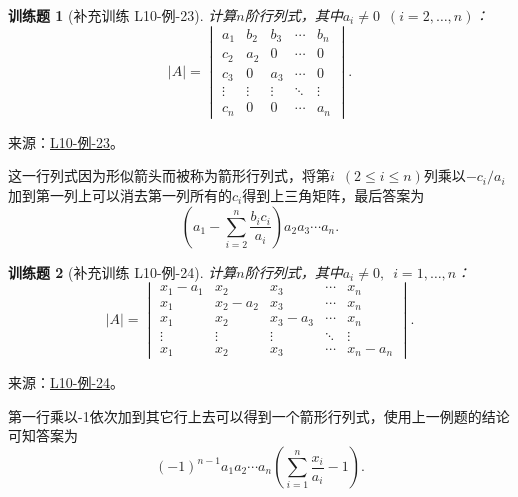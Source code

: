 \documentclass[12pt,fontset=fandol]{ctexart}
\newtheorem{exercise}{训练题}[section]
\begin{document}
\begin{exercise}[补充训练 L10-例-23]\label{prob:L10-例-23}
计算$n$阶行列式，其中$a_i\neq 0\enspace(i=2,\ldots,n)$：
    \[|A|=\begin{vmatrix}
            a_1    & b_2    & b_3    & \cdots & b_n    \\
            c_2    & a_2    & 0      & \cdots & 0      \\
            c_3    & 0      & a_3    & \cdots & 0      \\
            \vdots & \vdots & \vdots & \ddots & \vdots \\
            c_n    & 0      & 0      & \cdots & a_n
        \end{vmatrix}.\]
\end{exercise}
\noindent 来源：\href{https://github.com/yhwu-is/Linear-Algebra-Left-Undone/blob/new/%E8%AE%B2%E4%B9%89/%E4%B8%93%E9%A2%98/10%20%E8%A1%8C%E5%88%97%E5%BC%8F.tex}{L10-例-23}。
\begin{solve}
这一行列式因为形似箭头而被称为箭形行列式，将第$i\enspace(2\leqslant i\leqslant n)$列乘以$-c_i/a_i$加到第一列上可以消去第一列所有的$c_i$得到上三角矩阵，最后答案为
    \[
    (a_1-\sum\limits_{i=2}^n\dfrac{b_ic_i}{a_i})a_2a_3\cdots a_n.
    \]
\end{solve}

\begin{exercise}[补充训练 L10-例-24]\label{prob:L10-例-24}
计算$n$阶行列式，其中$a_i\neq 0,\enspace i=1,\ldots,n$：
    \[|A|=\begin{vmatrix}
            x_1-a_1 & x_2     & x_3     & \cdots & x_n     \\
            x_1     & x_2-a_2 & x_3     & \cdots & x_n     \\
            x_1     & x_2     & x_3-a_3 & \cdots & x_n     \\
            \vdots  & \vdots  & \vdots  & \ddots & \vdots  \\
            x_1     & x_2     & x_3     & \cdots & x_n-a_n
        \end{vmatrix}.\]
\end{exercise}
\noindent 来源：\href{https://github.com/yhwu-is/Linear-Algebra-Left-Undone/blob/new/%E8%AE%B2%E4%B9%89/%E4%B8%93%E9%A2%98/10%20%E8%A1%8C%E5%88%97%E5%BC%8F.tex}{L10-例-24}。
\begin{solve}
第一行乘以-1依次加到其它行上去可以得到一个箭形行列式，使用上一例题的结论可知答案为\[(-1)^{n-1}a_1a_2\cdots a_n(\sum\limits_{i=1}^n\dfrac{x_i}{a_i}-1).\]
\end{solve}
\end{document}
